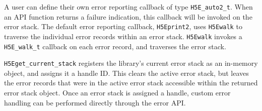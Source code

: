 \begin{itemize}
A user can define their own error reporting callback of type \texttt{H5E\_auto2\_t}. When an API function returns a failure indication, this callback will be invoked on the error stack. The default error reporting callback, \texttt{H5Eprint2}, uses \texttt{H5Ewalk} to traverse the individual error records within an error stack. \texttt{H5Ewalk} invokes a \texttt{H5E\_walk\_t} callback on each error record, and traverses the error stack.

\texttt{H5Eget\_current\_stack} registers the library's current error stack as an in-memory object, and assigns it a handle ID. This clears the active error stack, but leaves the error records that were in the active error stack accessible within the returned error stack object. Once an error stack is assigned a handle, custom error handling can be performed directly through the error API. 
\end{itemize}


